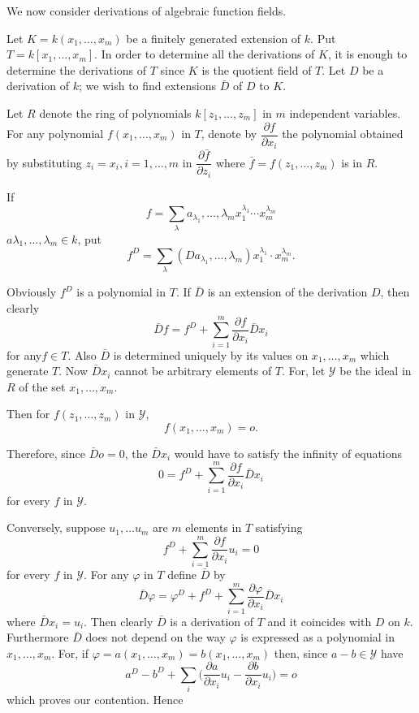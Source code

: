  We now consider derivations of algebraic function fields.
 
 Let $K=k(x_1,\ldots,x_m)$ be a finitely generated extension of
 $k$. Put $T=k[x_1,\ldots,x_m]$. In order to determine all the
 derivations of $K$, it is enough to determine the derivations of $T$
 since $K$ is the quotient field of $T$. Let $D$ be a derivation of
 $k$; we wish to find extensions $\bar{D}$ of $D$ to $K$. 
 
 Let $R$ denote the ring of polynomials $k[z_1,\ldots,z_m]$ in $m$
 independent variables. For any polynomial $f(x_1,\ldots,x_m)$ in $T$,
 denote by $\dfrac{\partial f}{\partial x_i}$ the polynomial obtained
 by substituting $z_i=x_i,i=1,\ldots, m$ in $\dfrac{\partial
   \bar{f}}{\partial z_i}$ where $\bar{f}=f(z_1,\ldots,z_m)$ is in
 $R$. 
 
 If
 $$
 f=\sum_\lambda a_{\lambda_1},\ldots,\lambda_m  x^{\lambda_1}_1\cdots 
 x^{\lambda_m}_m 
 $$
 $a \lambda_1,\ldots,\lambda_m \in k$, put 
 $$
 f^D =\sum_\lambda(D a_{\lambda_1},\ldots,\lambda_m)x^{\lambda_1}_1  
 \cdot x^{\lambda_m}_m. 
 $$
 
 Obviously $f^D$ is a polynomial in $T$. If $\bar{D}$ is an extension
 of the derivation $D$, then clearly 
 $$
 \bar{D}f = f^D+\sum^{m}_{i=1}\frac{\partial f}{\partial 
   x_i}\bar{D}x_i 
 $$
for any\pageoriginale $f \in T$. Also $\bar{D}$ is determined uniquely
by its values on $x_1, \ldots , x_m$ which generate $T$. Now
$\bar{D}x_i$ cannot be arbitrary elements of $T$. For, let
$\mathscr{Y}$ be the ideal in $R$ of the set $x_1, \ldots , x_m$.   

Then for $f(z_1, \ldots,z_m)$ in $\mathscr{Y}$,
$$
f(x_1, \ldots,x_m)=o.
$$

Therefore, since $\bar{D} o =0$, the $\bar{D} x_i$ would have to
satisfy the infinity of equations  
$$
0=f^D+ \sum^m_{i=1} \frac{\partial f}{\partial x_i}\bar{D} x_i
$$
for every $f$ in $\mathscr{Y}$.

Conversely, suppose $u_1, \ldots u_m$ are $m$ elements in $T$
satisfying  
$$
f^D+ \sum^m_{i=1} \frac{\partial f}{\partial x_i} u_i = 0
$$
for every $f$ in $\mathscr{Y}$. For any $\varphi$ in $T$ define
$\bar{D}$ by 
$$
\bar{D}\varphi = \varphi^D + f^D+ \sum^m_{i=1} \frac{\partial
  \varphi}{\partial x_i}\bar{D} x_i 
$$
where $\bar{D} x_i = u_i$. Then clearly $\bar{D}$ is a derivation of
$T$ and it coincides with $D$ on $k$. Furthermore $\bar{D}$ does not
depend on the way $\varphi$ is expressed as a polynomial in $x_1,
\ldots, x_m$. For, if $\varphi=a(x_1, \ldots, x_m) = b(x_1, \ldots,
x_m)$ then, since $a-b \in \mathscr{Y}$ have 
$$
a^D - b^D + \sum_i \big(\frac{\partial a}{\partial x_i}u_i - 
\frac{\partial b}{\partial x_i} u_i\bigg) = o 
$$
which proves our contention. Hence  

